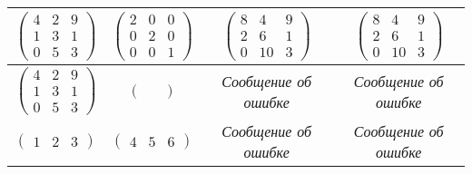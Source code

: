 \begin{table}[H]
\begin{center}
\begin{tabular}{|c|c|c|c|}
            \hline
            $\begin{pmatrix}
                4 & 2 & 9 \\
                1 & 3 & 1 \\
                0 & 5 & 3
            \end{pmatrix}$ &
            $\begin{pmatrix}
                2 & 0 & 0 \\
                0 & 2 & 0 \\
                0 & 0 & 1                
            \end{pmatrix}$ &
            $\begin{pmatrix}
                8 & 4 & 9 \\
                2 & 6 & 1 \\
                0 & 10 & 3
            \end{pmatrix}$ &
            $\begin{pmatrix}
                8 & 4 & 9 \\
                2 & 6 & 1 \\
                0 & 10 & 3
            \end{pmatrix}$ \\
            \hline
            $\begin{pmatrix}
                4 & 2 & 9 \\
                1 & 3 & 1 \\
                0 & 5 & 3
            \end{pmatrix}$ &
            $\begin{pmatrix}
                &
            \end{pmatrix}$ &
            \textit{Сообщение об ошибке} &
            \textit{Сообщение об ошибке} \\
            \hline
            $\begin{pmatrix}
                1 & 2 & 3
            \end{pmatrix}$ &
            $\begin{pmatrix}
                4 & 5 & 6
            \end{pmatrix}$ &
            \textit{Сообщение об ошибке} &
            \textit{Сообщение об ошибке} \\
            \hline
        \end{tabular}
	\end{center}
\end{table}

